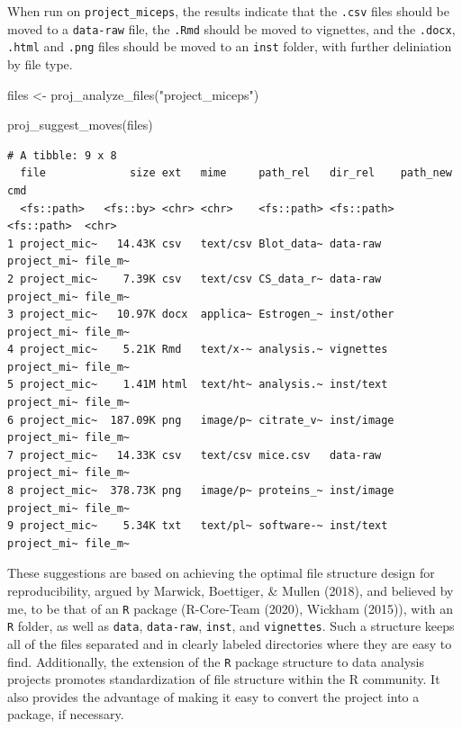 \documentclass[12pt,twoside]{reedthesis}
\newenvironment{Shaded}{\begin{snugshade}}{\end{snugshade}}
\newcommand{\FunctionTok}[1]{\textcolor[rgb]{0.00,0.00,0.00}{#1}}
\newcommand{\NormalTok}[1]{#1}
\newcommand{\OtherTok}[1]{\textcolor[rgb]{0.56,0.35,0.01}{#1}}
\newcommand{\StringTok}[1]{\textcolor[rgb]{0.31,0.60,0.02}{#1}}
\begin{document}
When run on \texttt{project\_miceps}, the results indicate that the \texttt{.csv} files should be moved to a \texttt{data-raw} file, the \texttt{.Rmd} should be moved to vignettes, and the \texttt{.docx}, \texttt{.html} and \texttt{.png} files should be moved to an \texttt{inst} folder, with further deliniation by file type.
\begin{Shaded}
\begin{Highlighting}[]
\NormalTok{files }\OtherTok{\textless{}{-}} \FunctionTok{proj\_analyze\_files}\NormalTok{(}\StringTok{"project\_miceps"}\NormalTok{)}

\FunctionTok{proj\_suggest\_moves}\NormalTok{(files)}
\end{Highlighting}
\end{Shaded}
\footnotesize
\begin{verbatim}
# A tibble: 9 x 8
  file             size ext   mime     path_rel   dir_rel    path_new    cmd    
  <fs::path>   <fs::by> <chr> <chr>    <fs::path> <fs::path> <fs::path>  <chr>  
1 project_mic~   14.43K csv   text/csv Blot_data~ data-raw   project_mi~ file_m~
2 project_mic~    7.39K csv   text/csv CS_data_r~ data-raw   project_mi~ file_m~
3 project_mic~   10.97K docx  applica~ Estrogen_~ inst/other project_mi~ file_m~
4 project_mic~    5.21K Rmd   text/x-~ analysis.~ vignettes  project_mi~ file_m~
5 project_mic~    1.41M html  text/ht~ analysis.~ inst/text  project_mi~ file_m~
6 project_mic~  187.09K png   image/p~ citrate_v~ inst/image project_mi~ file_m~
7 project_mic~   14.33K csv   text/csv mice.csv   data-raw   project_mi~ file_m~
8 project_mic~  378.73K png   image/p~ proteins_~ inst/image project_mi~ file_m~
9 project_mic~    5.34K txt   text/pl~ software-~ inst/text  project_mi~ file_m~
\end{verbatim}
\normalsize

These suggestions are based on achieving the optimal file structure design for reproducibility, argued by Marwick, Boettiger, \& Mullen (2018), and believed by me, to be that of an \texttt{R} package (R-Core-Team (2020), Wickham (2015)), with an \texttt{R} folder, as well as \texttt{data}, \texttt{data-raw}, \texttt{inst}, and \texttt{vignettes}. Such a structure keeps all of the files separated and in clearly labeled directories where they are easy to find. Additionally, the extension of the \texttt{R} package structure to data analysis projects promotes standardization of file structure within the R community. It also provides the advantage of making it easy to convert the project into a package, if necessary.
\end{document}
